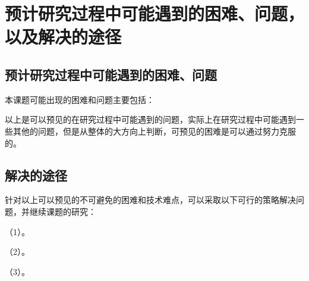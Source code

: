 
\section{预计研究过程中可能遇到的困难、问题，以及解决的途径}

\subsection{预计研究过程中可能遇到的困难、问题}

本课题可能出现的困难和问题主要包括：



以上是可以预见的在研究过程中可能遇到的问题，实际上在研究过程中可能遇到一些其他的问题，但是从整体的大方向上判断，可预见的困难是可以通过努力克服的。

\subsection{解决的途径}

针对以上可以预见的不可避免的困难和技术难点，可以采取以下可行的策略解决问题，并继续课题的研究：

（1）。

（2）。

（3）。

